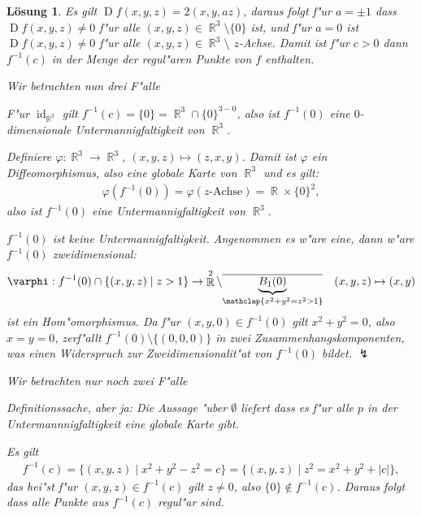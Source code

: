 \documentclass[paper=A4, twoside, chapterprefix=true, bibliography=totoc, headsepline]{scrbook}
\let\temp\phi{}
\let\phi\varphi{}
\let\varphi\temp{}
\let\temp\theta{}
\let\theta\vartheta{}
\let\vartheta\temp{}
\let\temp\epsilon{}
\let\epsilon\varepsilon{}
\let\varepsilon\temp{}
\let\temp\rho{}
\let\rho\varrho{}
\let\varrho\temp{}
\DeclareMathOperator{\R}{\mathbb{R}}
\DeclareMathOperator{\id}{id}       %
\DeclareMathOperator{\D}{D}         %
\newcommand{\X}{\times}
\theoremstyle{plain}
\theoremstyle{nonumberplain}
\theoremstyle{empty}
\theoremstyle{break}
\newtheorem{Loes}{L\"osung}
\begin{document}
\begin{Loes}
Es gilt $\D f (x, y, z) = 2(x, y, az)$, daraus folgt f"ur $a = \pm 1 $ dass $\D f(x, y, z) \ne 0$ f"ur alle $(x, y, z) \in \R^3 \setminus \{0\}$ ist, und f"ur $a = 0$ ist $\D f(x, y, z) \ne 0$ f"ur alle $(x, y, z) \in \R^3 \setminus$ $z$-Achse.
Damit ist f"ur $c > 0$ dann $f^{-1}(c)$ in der Menge der regul"aren Punkte von $f$ enthalten.
\begin{description}[leftmargin=*]
\item[F"ur $\bm{c = 0}$:]
	Wir betrachten nun drei F"alle
	\begin{description}[font=\normalfont]
	\item[$a = 1$:]
		F"ur $\id_{\R^3}$ gilt $f^{-1}(c) = \{0\} = \R^3 \cap \{0\}^{3-0}$, also ist $f^{-1}(0)$ eine $0$-dimensionale Untermannigfaltigkeit von $\R^3$.
	\item[$a = 0$:]
		Definiere $\phi: \R^3 \to \R^3$, $(x, y, z) \mapsto (z, x, y)$.
		Damit ist $\phi$ ein Diffeomorphismus, also eine globale Karte von $\R^3$ und es gilt:
		\begin{align*}
			\phi(f^{-1}(0)) = \phi(z \text{-Achse}) = \R \X \{0\}^2,
		\end{align*}
		also ist $f^{-1}(0)$ eine Untermannigfaltigkeit von $\R^3$.
	\item[$a = -1$:]
		$f^{-1}(0)$ ist keine Untermannigfaltigkeit. Angenommen es w"are eine, dann w"are $f^{-1}(0)$ zweidimensional:
		\begin{align*}
			\phi: f^{-1}(0) \cap \{(x, y, z) \mid z > 1 \} \to \R^2 \setminus \overline{\underbrace{B_1(0)}_{\mathclap{x^2 + y^2 = z^2 > 1}}} &&
			(x, y, z) \mapsto (x, y)
		\end{align*}
		ist ein Hom"omorphismus.
		Da f"ur $(x, y, 0) \in f^{-1}(0)$ gilt $x^2 + y^2 = 0$, also $x = y = 0$, zerf"allt $f^{-1}(0) \setminus \{(0,0,0)\}$ in zwei Zusammenhangskomponenten, was einen Widerspruch zur Zweidimensionalit"at von $f^{-1}(0)$ bildet. $\lightning$
	\end{description}
\item[F"ur $\bm{c < 0}$:]
	Wir betrachten nur noch zwei F"alle
	\begin{description}[font=\normalfont]
	\item[$a = 1, 0$:]
		Definitionssache, aber ja: Die Aussage "uber $\emptyset$ liefert dass es f"ur alle $p$ in der Untermannnigfaltigkeit eine globale Karte gibt.
	\item[$a = -1$:]
		Es gilt
		\begin{align*}
			f^{-1}(c) = \{ (x,y,z) \mid x^2 + y^2 - z^2 = c \} = \{ (x,y,z) \mid z^2 = x^2 + y^2 + |c| \},
		\end{align*}
		das hei"st f"ur $(x, y, z) \in f^{-1}(c)$ gilt $z \ne 0$, also $\{0\} \notin f^{-1}(c)$.
		Daraus folgt dass alle Punkte aus $f^{-1}(c)$ regul"ar sind.
	\end{description}
\end{description}
\end{Loes}
\end{document}
